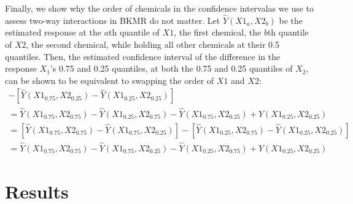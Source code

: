 \documentclass[12pt, twoside]{amherstthesis}
\begin{document}
Finally, we show why the order of chemicals in the confidence intervalas we use to assess two-way interactions in BKMR do not matter. Let \(\widehat{Y}(X1_a,X2_b)\) be the estimated response at the \(a\)th quantile of \(X1\), the first chemical, the \(b\)th quantile of \(X2\), the second chemical, while holding all other chemicals at their 0.5 quantiles. Then, the estimated confidence interval of the difference in the response \(X_1\)'s 0.75 and 0.25 quantiles, at both the 0.75 and 0.25 quantiles of \(X_2\), can be shown to be equivalent to swapping the order of \(X1\) and \(X2\):
\begin{multline}
[\widehat{Y}(X1_{0.75},X2_{0.75})-\widehat{Y}(X1_{0.25},X2_{0.75})] - [\widehat{Y}(X1_{0.75},X2_{0.25})-\widehat{Y}(X1_{0.25},X2_{0.25})] \\
= \widehat{Y}(X1_{0.75},X2_{0.75})-\widehat{Y}(X1_{0.25},X2_{0.75}) - \widehat{Y}(X1_{0.75},X2_{0.25})+\widehat{Y}(X1_{0.25},X2_{0.25}) \\
= [\widehat{Y}(X1_{0.75},X2_{0.75})-\widehat{Y}(X1_{0.75},X2_{0.25})] - [\widehat{Y}(X1_{0.25},X2_{0.75})-\widehat{Y}(X1_{0.25},X2_{0.25})] \\
= \widehat{Y}(X1_{0.75},X2_{0.75})- \widehat{Y}(X1_{0.75},X2_{0.25})
-\widehat{Y}(X1_{0.25},X2_{0.75}) +\widehat{Y}(X1_{0.25},X2_{0.25})
  \label{eq:confinteq}
\end{multline}
\hypertarget{suppresults}{%
\section{Results}\label{suppresults}}
\end{document}
